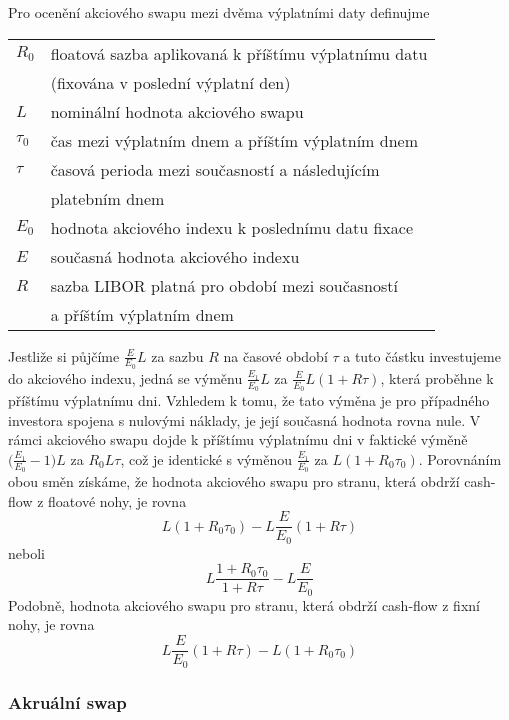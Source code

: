 \documentclass[a4paper]{book}
\begin{document}
Pro ocenění akciového swapu mezi dvěma výplatními daty definujme
\begin{center}
\begin{tabular}{l l}
$R_0$ & floatová sazba aplikovaná k příštímu výplatnímu datu\\
 & (fixována v poslední výplatní den)\\
$L$ & nominální hodnota akciového swapu\\
$\tau_0$ & čas mezi výplatním dnem a příštím výplatním dnem\\
$\tau$ & časová perioda mezi současností a následujícím\\
 & platebním dnem\\
$E_0$ & hodnota akciového indexu k poslednímu datu fixace\\
$E$ & současná hodnota akciového indexu\\
$R$ & sazba LIBOR platná pro období mezi současností\\
 & a příštím výplatním dnem\\
\end{tabular}
\end{center}
Jestliže si půjčíme $\frac{E}{E_0}L$ za sazbu $R$ na časové období $\tau$ a tuto částku investujeme do akciového indexu, jedná se výměnu $\frac{E_1}{E_0}L$ za $\frac{E}{E_0}L(1 + R \tau)$, která proběhne k příštímu výplatnímu dni. Vzhledem k tomu, že tato výměna je pro případného investora spojena s nulovými náklady, je její současná  hodnota rovna nule. V rámci akciového swapu dojde k příštímu výplatnímu dni v faktické výměně $\Big( \frac{E_1}{E_0} - 1 \Big)L$ za $R_0 L \tau$, což je identické s výměnou $\frac{E_1}{E_0}$ za  $L(1 + R_0 \tau_0)$. Porovnáním obou směn získáme, že hodnota akciového swapu pro stranu, která obdrží cash-flow z floatové nohy, je rovna
\begin{equation*}
L(1 + R_0 \tau_0)-L \frac{E}{E_0}(1 + R \tau)
\end{equation*}
neboli
\begin{equation*}
L \frac{1 + R_0 \tau_0}{1 + R \tau} - L \frac{E}{E_0}
\end{equation*}
Podobně, hodnota akciového swapu pro stranu, která obdrží cash-flow z fixní nohy, je rovna
\begin{equation*}
L \frac{E}{E_0}(1 + R \tau) - L(1 + R_0 \tau_0)
\end{equation*}

\subsubsection{Akruální swap}
\end{document}
